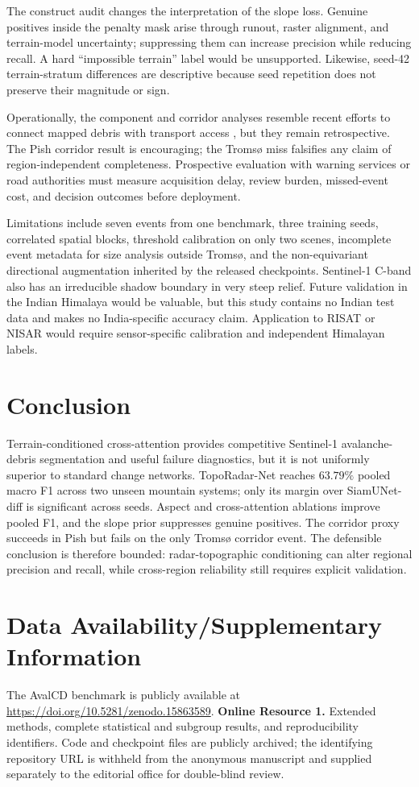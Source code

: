 \documentclass[referee,lineno,pdflatex,sn-apa]{sn-jnl}
\begin{document}
The construct audit changes the interpretation of the slope loss. Genuine positives inside the penalty mask arise through runout, raster alignment, and terrain-model uncertainty; suppressing them can increase precision while reducing recall. A hard ``impossible terrain'' label would be unsupported. Likewise, seed-42 terrain-stratum differences are descriptive because seed repetition does not preserve their magnitude or sign.

Operationally, the component and corridor analyses resemble recent efforts to connect mapped debris with transport access \citep{bayat2026debris}, but they remain retrospective. The Pish corridor result is encouraging; the Troms{\o} miss falsifies any claim of region-independent completeness. Prospective evaluation with warning services or road authorities must measure acquisition delay, review burden, missed-event cost, and decision outcomes before deployment.

Limitations include seven events from one benchmark, three training seeds, correlated spatial blocks, threshold calibration on only two scenes, incomplete event metadata for size analysis outside Troms{\o}, and the non-equivariant directional augmentation inherited by the released checkpoints. Sentinel-1 C-band also has an irreducible shadow boundary in very steep relief. Future validation in the Indian Himalaya would be valuable, but this study contains no Indian test data and makes no India-specific accuracy claim. Application to RISAT or NISAR would require sensor-specific calibration and independent Himalayan labels.

\section{Conclusion}

Terrain-conditioned cross-attention provides competitive Sentinel-1 avalanche-debris segmentation and useful failure diagnostics, but it is not uniformly superior to standard change networks. TopoRadar-Net reaches $63.79\%$ pooled macro F1 across two unseen mountain systems; only its margin over SiamUNet-diff is significant across seeds. Aspect and cross-attention ablations improve pooled F1, and the slope prior suppresses genuine positives. The corridor proxy succeeds in Pish but fails on the only Troms{\o} corridor event. The defensible conclusion is therefore bounded: radar-topographic conditioning can alter regional precision and recall, while cross-region reliability still requires explicit validation.

\section*{Data Availability/Supplementary Information}

The AvalCD benchmark is publicly available at \url{https://doi.org/10.5281/zenodo.15863589}. \textbf{Online Resource 1.} Extended methods, complete statistical and subgroup results, and reproducibility identifiers. Code and checkpoint files are publicly archived; the identifying repository URL is withheld from the anonymous manuscript and supplied separately to the editorial office for double-blind review.


\end{document}
